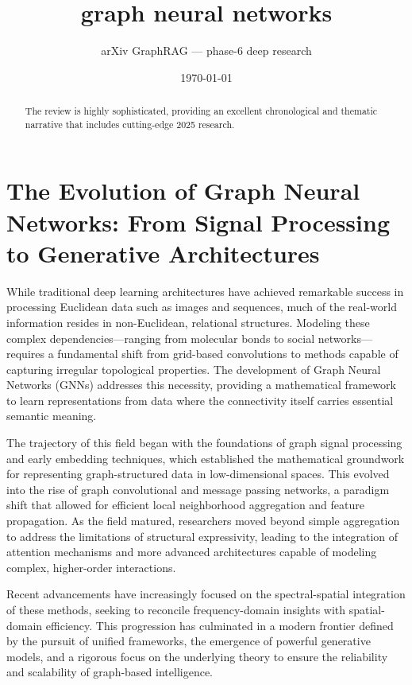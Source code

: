 \documentclass[11pt]{article}
\title{graph neural networks}
\author{arXiv GraphRAG --- phase-6 deep research}
\date{\today}
\begin{document}
\maketitle

\begin{abstract}
The review is highly sophisticated, providing an excellent chronological and thematic narrative that includes cutting-edge 2025 research.
\end{abstract}

\section{The Evolution of Graph Neural Networks: From Signal Processing to Generative Architectures}

While traditional deep learning architectures have achieved remarkable success in processing Euclidean data such as images and sequences, much of the real-world information resides in non-Euclidean, relational structures. Modeling these complex dependencies—ranging from molecular bonds to social networks—requires a fundamental shift from grid-based convolutions to methods capable of capturing irregular topological properties. The development of Graph Neural Networks (GNNs) addresses this necessity, providing a mathematical framework to learn representations from data where the connectivity itself carries essential semantic meaning.

The trajectory of this field began with the foundations of graph signal processing and early embedding techniques, which established the mathematical groundwork for representing graph-structured data in low-dimensional spaces. This evolved into the rise of graph convolutional and message passing networks, a paradigm shift that allowed for efficient local neighborhood aggregation and feature propagation. As the field matured, researchers moved beyond simple aggregation to address the limitations of structural expressivity, leading to the integration of attention mechanisms and more advanced architectures capable of modeling complex, higher-order interactions.

Recent advancements have increasingly focused on the spectral-spatial integration of these methods, seeking to reconcile frequency-domain insights with spatial-domain efficiency. This progression has culminated in a modern frontier defined by the pursuit of unified frameworks, the emergence of powerful generative models, and a rigorous focus on the underlying theory to ensure the reliability and scalability of graph-based intelligence.
\end{document}

